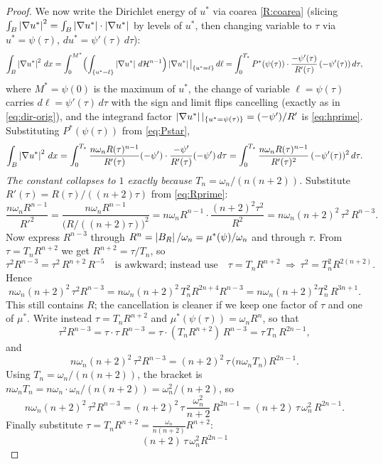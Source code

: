\begin{proof}
We now write the Dirichlet energy of $u^*$ via coarea
\ref{R:coarea} (slicing $\int_B\left|\nabla u^*\right|^2=\int_B\left|\nabla u^*\right|\cdot
\left|\nabla u^*\right|$ by levels of $u^*$, then changing variable to $\tau$ via
$u^*=\psi(\tau)$, $du^*=\psi'(\tau)\,d\tau$):
\[
  \int_B\left|\nabla u^*\right|^2\,dx
  =\int_0^{M^*}\Bigl(\int_{\{u^*=\ell\}}\left|\nabla u^*\right|\,d\mathcal H^{n-1}\Bigr)
     \left|\nabla u^*\right|\big|_{\{u^*=\ell\}}\,d\ell
  =\int_0^{T_\star}P^*(\psi(\tau))\cdot\frac{-\psi'(\tau)}{R'(\tau)}
     \,(-\psi'(\tau))\,d\tau,
\]
where $M^*=\psi(0)$ is the maximum of $u^*$, the change of variable
$\ell=\psi(\tau)$ carries $d\ell=\psi'(\tau)\,d\tau$ with the sign and limit
flips cancelling (exactly as in \eqref{eq:dir-orig}), and the integrand
factor $\left|\nabla u^*\right||_{\{u^*=\psi(\tau)\}}=(-\psi')/R'$ is
\eqref{eq:hprime}. Substituting $P^*(\psi(\tau))$ from \eqref{eq:Pstar},
\[
  \int_B\left|\nabla u^*\right|^2\,dx
  =\int_0^{T_\star}\frac{n\omega_n R(\tau)^{n-1}}{R'(\tau)}(-\psi')
     \cdot\frac{-\psi'}{R'(\tau)}(-\psi')\,d\tau
  =\int_0^{T_\star}\frac{n\omega_n R(\tau)^{n-1}}{R'(\tau)^2}\,
     (-\psi'(\tau))^2\,d\tau .
\]
\emph{The constant collapses to $1$ exactly because $T_n=\omega_n/(n(n+2))$.}
Substitute $R'(\tau)=R(\tau)/((n+2)\tau)$ from \eqref{eq:Rprime}:
\[
  \frac{n\omega_n R^{n-1}}{R'^2}
  =\frac{n\omega_n R^{n-1}}{\bigl(R/((n+2)\tau)\bigr)^2}
  =n\omega_n R^{n-1}\cdot\frac{(n+2)^2\tau^2}{R^2}
  =n\omega_n (n+2)^2\,\tau^2\,R^{n-3}.
\]
Now express $R^{n-3}$ through $R^n=\left|B_R\right|/\omega_n=\mu^*(\psi)/\omega_n$
and through $\tau$. From $\tau=T_n R^{n+2}$ we get $R^{n+2}=\tau/T_n$, so
\[
  \tau^2 R^{n-3}=\tau^2\,R^{n+2}\,R^{-5}\quad\text{is awkward; instead use}
  \quad \tau=T_n R^{n+2}\ \Rightarrow\ \tau^2=T_n^2 R^{2(n+2)} .
\]
Hence
\[
  n\omega_n(n+2)^2\,\tau^2 R^{n-3}
  =n\omega_n(n+2)^2\,T_n^2 R^{2n+4}R^{n-3}
  =n\omega_n(n+2)^2 T_n^2\,R^{3n+1}.
\]
This still contains $R$; the cancellation is cleaner if we keep one factor
of $\tau$ and one of $\mu^*$. Write instead
$\tau=T_n R^{n+2}$ and $\mu^*(\psi(\tau))=\omega_n R^n$, so that
\[
  \tau^2 R^{n-3}
  =\tau\cdot\tau\,R^{n-3}
  =\tau\cdot(T_n R^{n+2})\,R^{n-3}
  =\tau\,T_n\,R^{2n-1},
\]
and
\[
  n\omega_n(n+2)^2\,\tau^2R^{n-3}
  =(n+2)^2\,\tau\,\bigl(n\omega_n T_n\bigr)\,R^{2n-1}.
\]
Using $T_n=\omega_n/(n(n+2))$, the bracket is $n\omega_n T_n
=n\omega_n\cdot\omega_n/(n(n+2))=\omega_n^2/(n+2)$, so
\[
  n\omega_n(n+2)^2\,\tau^2R^{n-3}
  =(n+2)^2\,\tau\,\frac{\omega_n^2}{n+2}\,R^{2n-1}
  =(n+2)\,\tau\,\omega_n^2\,R^{2n-1}.
\]
Finally substitute $\tau=T_n R^{n+2}=\tfrac{\omega_n}{n(n+2)}R^{n+2}$:
\[
  (n+2)\,\tau\,\omega_n^2 R^{2n-1}
\]
\end{proof}
